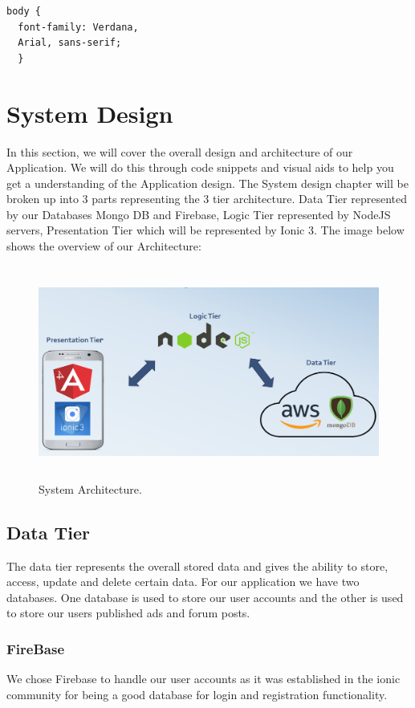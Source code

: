 \begin{verbatim}
body {
  font-family: Verdana, 
  Arial, sans-serif;
  }
\end{verbatim}

\chapter{System Design}

In this section, we will cover the overall design and architecture of our Application. We will do this through code snippets and visual aids to help you get a understanding of the Application design. The System design chapter will be broken up into 3 parts representing the 3 tier architecture. Data Tier represented by our Databases Mongo DB and Firebase, Logic Tier represented by NodeJS servers, Presentation Tier which will be represented by Ionic 3.
The image below shows the overview of our Architecture:

\begin{figure}[h]
\centering
\includegraphics[width=14cm, height=7cm]{img/Architecture}
\caption{System Architecture.}
\end{figure}

\section{Data Tier}

The data tier represents the overall stored data and gives the ability to store, access, update and delete certain data. For our application we have two databases. One database is used to store our user accounts and the other is used to store our users published ads and forum posts.

\subsection{FireBase}
We chose Firebase to handle our user accounts as it was established in the ionic community for being a good database for login and registration functionality.

